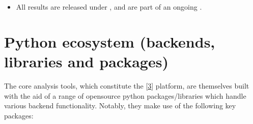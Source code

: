 \documentclass[letterpaper,table,10pt,english]{jupyterBook}
\begin{document}
\begin{itemize}
\begin{itemize}
\item {} 
\sphinxAtStartPar
All results are released under , and are part of an ongoing .

\end{itemize}

\end{itemize}


\section{Python ecosystem (backends, libraries and packages)}
\label{\detokenize{part1/platform_intro_070723:python-ecosystem-backends-libraries-and-packages}}\label{\detokenize{part1/platform_intro_070723:sect-platform-pythonecosystem}}
\sphinxAtStartPar
The core analysis tools, which constitute the  {[}\hyperlink{cite.backmatter/bibliography:id668}{3}{]} platform, are themselves built with the aid of a range of open\sphinxhyphen{}source python packages/libraries which handle various backend functionality. Notably, they make use of the following key packages:
\end{document}
